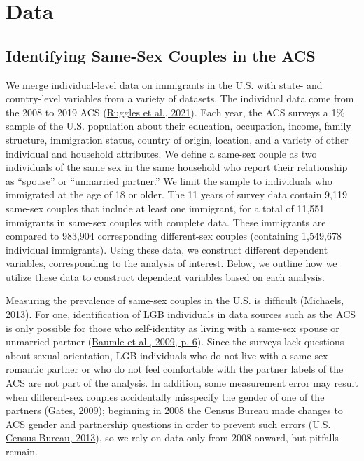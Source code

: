 \documentclass[
  11pt,
]{article}
\begin{document}
\hypertarget{data}{%
\section{Data}\label{data}}

\hypertarget{identifying-same-sex-couples-in-the-acs}{%
\subsection{Identifying Same-Sex Couples in the ACS}\label{identifying-same-sex-couples-in-the-acs}}

We merge individual-level data on immigrants in the U.S. with state- and country-level variables from a variety of datasets. The individual data come from the 2008 to 2019 ACS (\protect\hyperlink{ref-ruggles_2021}{Ruggles et al., 2021}). Each year, the ACS surveys a 1\% sample of the U.S. population about their education, occupation, income, family structure, immigration status, country of origin, location, and a variety of other individual and household attributes. We define a same-sex couple as two individuals of the same sex in the same household who report their relationship as ``spouse'' or ``unmarried partner.'' We limit the sample to individuals who immigrated at the age of 18 or older. The 11 years of survey data contain 9,119 same-sex couples that include at least one immigrant, for a total of 11,551 immigrants in same-sex couples with complete data. These immigrants are compared to 983,904 corresponding different-sex couples (containing 1,549,678 individual immigrants). Using these data, we construct different dependent variables, corresponding to the analysis of interest. Below, we outline how we utilize these data to construct dependent variables based on each analysis.

Measuring the prevalence of same-sex couples in the U.S. is difficult (\protect\hyperlink{ref-michaels_2013}{Michaels, 2013}). For one, identification of LGB individuals in data sources such as the ACS is only possible for those who self-identity as living with a same-sex spouse or unmarried partner (\protect\hyperlink{ref-baumle_2009}{Baumle et al., 2009, p. 6}). Since the surveys lack questions about sexual orientation, LGB individuals who do not live with a same-sex romantic partner or who do not feel comfortable with the partner labels of the ACS are not part of the analysis. In addition, some measurement error may result when different-sex couples accidentally misspecify the gender of one of the partners (\protect\hyperlink{ref-gates_2009a}{Gates, 2009}); beginning in 2008 the Census Bureau made changes to ACS gender and partnership questions in order to prevent such errors (\protect\hyperlink{ref-u.s.censusbureau_2013}{U.S. Census Bureau, 2013}), so we rely on data only from 2008 onward, but pitfalls remain.
\end{document}

